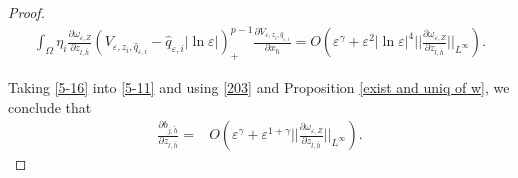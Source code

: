 \documentclass[12pt,reqno]{amsart}
\numberwithin{equation}{section}
\theoremstyle{definition}
\theoremstyle{remark}
\begin{document}
\begin{proof}
\begin{equation}
\begin{split}
\int_{\Omega}\eta_i\frac{\partial \omega_{\varepsilon,Z} }{\partial z_{l,\bar{h}}} \left (V_{\varepsilon, z_i, \hat{q}_{\varepsilon,i}}-\hat{q}_{\varepsilon,i}|\ln\varepsilon|\right )^{p-1}_+\frac{\partial V_{\varepsilon, z_i, \hat{q}_{\varepsilon,i}}}{\partial x_\hbar}=O\left(  \varepsilon^\gamma +\varepsilon^2|\ln\varepsilon|^{4}\bigg|\bigg|\frac{\partial \omega_{\varepsilon,Z} }{\partial z_{l,\bar{h}}}\bigg|\bigg|_{L^\infty}\right).
\end{split}
\end{equation}

Taking \eqref{5-16} into \eqref{5-11} and using \eqref{203} and Proposition \ref{exist and uniq of w}, we conclude that
\begin{equation}\label{5-17}
\begin{split}
\frac{\partial b_{j,\tilde{h}}}{\partial z_{l,\bar{h}}}=& O\left( \varepsilon^\gamma+ \varepsilon^{1+\gamma}\bigg|\bigg|\frac{\partial \omega_{\varepsilon,Z} }{\partial z_{l,\bar{h}}}\bigg|\bigg|_{L^\infty}\right).
\end{split}
\end{equation}


\end{proof}
\end{document}
